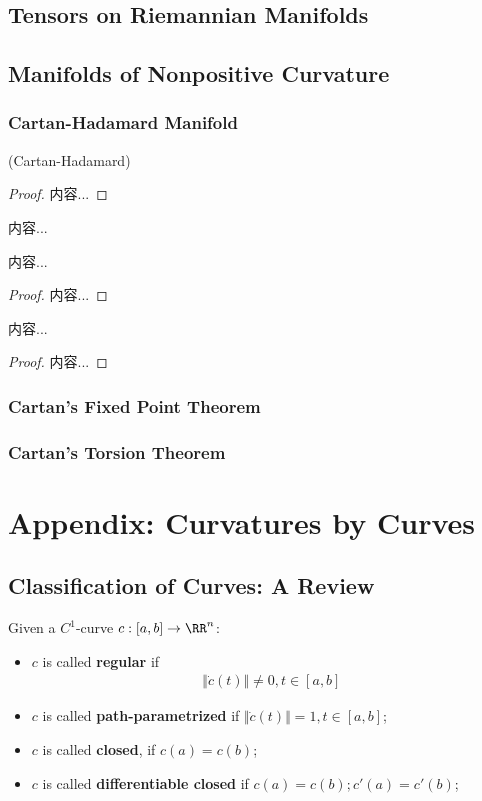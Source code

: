 \documentclass[Total.tex]{subfiles}
\begin{document}
		\section{Tensors on Riemannian Manifolds}
		\section{Manifolds of Nonpositive Curvature}
			\subsection{Cartan-Hadamard Manifold}
			\begin{theorem}
				(Cartan-Hadamard)
			\end{theorem}
			\begin{proof}
				内容...
			\end{proof}
			\begin{Def}
				内容...
			\end{Def}
			\begin{proposition}
				内容...
			\end{proposition}
			\begin{proof}
				内容...
			\end{proof}
			
			\begin{proposition}
				内容...
			\end{proposition}
			\begin{proof}
				内容...
			\end{proof}
			\subsection{Cartan's Fixed Point Theorem}
			\subsection{Cartan's Torsion Theorem}
	\chapter{Appendix: Curvatures by Curves}
		\section{Classification of Curves: A Review}
			\begin{Def}
				Given a $C^1$-curve $c:[a,b]\rightarrow \RR^n$:
				
				\begin{itemize}
					\item $c$ is called \textbf{regular} if
					\begin{gather*}
						\Vert \dot{c}(t)\Vert\not=0,t\in [a,b]
					\end{gather*}
					\item $c$ is called \textbf{path-parametrized} if $\Vert \dot{c}(t)\Vert=1,t\in [a,b]$;
					\item $c$ is called \textbf{closed}, if $c(a)=c(b)$;
					\item $c$ is called \textbf{differentiable closed} if $c(a)=c(b);c'(a)=c'(b)$;
				\end{itemize}
			\end{Def}
			
\end{document}
